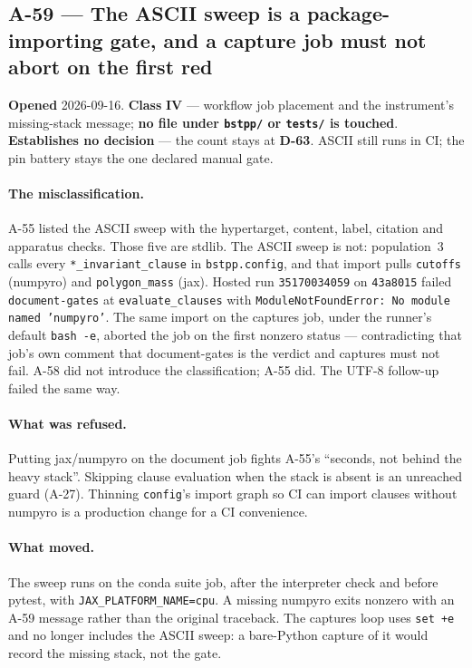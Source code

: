 \documentclass[
  10pt,
]{article}
\begin{document}
\hypertarget{a-59}{%
\subsection{A-59 --- The ASCII sweep is a package-importing gate, and a capture
job must not abort on the first red}\label{a-59}}

\textbf{Opened} 2026-09-16. \textbf{Class} \textbf{IV} --- workflow job
placement and the instrument's missing-stack message; \textbf{no file under
\texttt{bstpp/} or \texttt{tests/} is touched}. \textbf{Establishes no
decision} --- the count stays at \textbf{D-63}. ASCII still runs in CI; the
pin battery stays the one declared manual gate.

\paragraph{The misclassification.}
A-55 listed the ASCII sweep with the hypertarget, content, label, citation and
apparatus checks. Those five are stdlib. The ASCII sweep is not: population~3
calls every \texttt{*\_invariant\_clause} in \texttt{bstpp.config}, and that
import pulls \texttt{cutoffs} (numpyro) and \texttt{polygon\_mass} (jax). Hosted
run \texttt{35170034059} on \texttt{43a8015} failed
\texttt{document-gates} at \texttt{evaluate\_clauses} with
\texttt{ModuleNotFoundError: No module named 'numpyro'}. The same import on
the captures job, under the runner's default \texttt{bash -e}, aborted the
job on the first nonzero status --- contradicting that job's own comment that
document-gates is the verdict and captures must not fail. A-58 did not
introduce the classification; A-55 did. The UTF-8 follow-up failed the same
way.

\paragraph{What was refused.}
Putting jax/numpyro on the document job fights A-55's ``seconds, not behind
the heavy stack''. Skipping clause evaluation when the stack is absent is an
unreached guard (A-27). Thinning \texttt{config}'s import graph so CI can
import clauses without numpyro is a production change for a CI convenience.

\paragraph{What moved.}
The sweep runs on the conda suite job, after the interpreter check and before
pytest, with \texttt{JAX\_PLATFORM\_NAME=cpu}. A missing numpyro exits
nonzero with an A-59 message rather than the original traceback. The captures
loop uses \texttt{set +e} and no longer includes the ASCII sweep: a
bare-Python capture of it would record the missing stack, not the gate.
\end{document}
